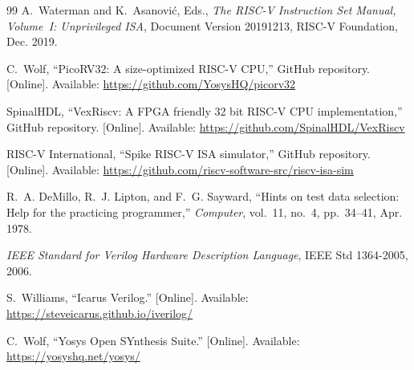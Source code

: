 \documentclass[conference]{IEEEtran}
\begin{document}
\begin{thebibliography}{99}
A.~Waterman and K.~Asanovi\'{c}, Eds., \emph{The RISC-V Instruction Set Manual, Volume~I: Unprivileged ISA}, Document Version 20191213, RISC-V Foundation, Dec. 2019.

C.~Wolf, ``PicoRV32: A size-optimized RISC-V CPU,'' GitHub repository. [Online]. Available: \url{https://github.com/YosysHQ/picorv32}

SpinalHDL, ``VexRiscv: A FPGA friendly 32 bit RISC-V CPU implementation,'' GitHub repository. [Online]. Available: \url{https://github.com/SpinalHDL/VexRiscv}

RISC-V International, ``Spike RISC-V ISA simulator,'' GitHub repository. [Online]. Available: \url{https://github.com/riscv-software-src/riscv-isa-sim}

R.~A. DeMillo, R.~J. Lipton, and F.~G. Sayward, ``Hints on test data selection: Help for the practicing programmer,'' \emph{Computer}, vol.~11, no.~4, pp.~34--41, Apr. 1978.

\emph{IEEE Standard for Verilog Hardware Description Language}, IEEE Std 1364-2005, 2006.

S.~Williams, ``Icarus Verilog.'' [Online]. Available: \url{https://steveicarus.github.io/iverilog/}

C.~Wolf, ``Yosys Open SYnthesis Suite.'' [Online]. Available: \url{https://yosyshq.net/yosys/}

\end{thebibliography}
\end{document}
